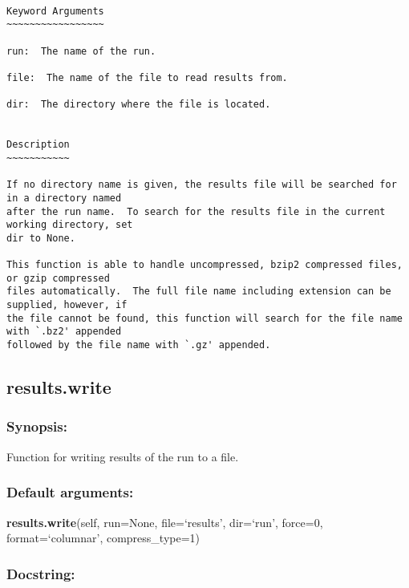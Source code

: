 {\scriptsize
\begin{verbatim}

Keyword Arguments
~~~~~~~~~~~~~~~~~

run:  The name of the run.

file:  The name of the file to read results from.

dir:  The directory where the file is located.


Description
~~~~~~~~~~~

If no directory name is given, the results file will be searched for in a directory named
after the run name.  To search for the results file in the current working directory, set
dir to None.

This function is able to handle uncompressed, bzip2 compressed files, or gzip compressed
files automatically.  The full file name including extension can be supplied, however, if
the file cannot be found, this function will search for the file name with `.bz2' appended
followed by the file name with `.gz' appended.
\end{verbatim}
}



\newpage

\subsection{results.write}


\subsubsection{Synopsis:}

Function for writing results of the run to a file.

\subsubsection{Default arguments:}

\textsf{\textbf{results.write}(self, run=None, file=`results', dir=`run', force=0, format=`columnar', compress\_type=1)
}


\subsubsection{Docstring:}

